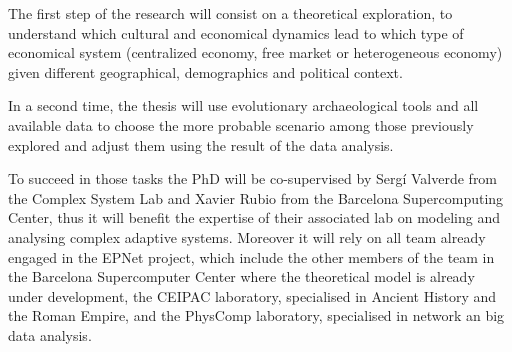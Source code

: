 \documentclass[a4paper]{article}
\begin{document}
The first step of the research will consist on a theoretical exploration, to understand which cultural and economical dynamics lead to which type of economical system (centralized economy, free market or heterogeneous economy) given different geographical, demographics and political context.

In a second time, the thesis will use evolutionary archaeological tools and all available data to choose the more probable scenario among those previously explored and adjust them using the result of the data analysis.

To succeed in those tasks the PhD will be co-supervised by Sergí Valverde from the Complex System Lab and Xavier Rubio from the Barcelona Supercomputing Center, thus it will benefit the expertise of their associated lab on modeling and analysing complex adaptive systems. Moreover it will rely on all team already engaged in the EPNet project, which include the other members of the team in the Barcelona Supercomputer Center where the theoretical model is already under development, the CEIPAC laboratory, specialised in Ancient History and the Roman Empire, and the PhysComp laboratory, specialised in network an big data analysis.
\end{document}
